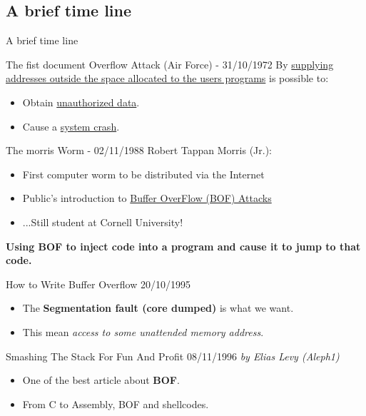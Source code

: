 \subsection{A brief time line}
\begin{frame}{A brief time line}

\begin{block}{The fist document Overflow Attack (Air Force) - 31/10/1972}
By \underline{supplying addresses outside the space allocated to the users programs} is possible to: 
\begin{itemize}
\item Obtain \underline{unauthorized data}.
\item Cause a \underline{system crash}.
\end{itemize}
\end{block}

\framebreak

\begin{block}{The morris Worm - 02/11/1988}
	Robert Tappan Morris (Jr.):
	\begin{itemize}
 		\item First computer worm to be distributed via the Internet
 		\item Public’s introduction to \underline{Buffer OverFlow (BOF) Attacks}
 		\item ...Still student at Cornell University!
 	\end{itemize}

\begin{center}
\bf Using BOF to inject code into a program and cause it to jump to that code.
\end{center}

\end{block}

\framebreak

\begin{block}{How to Write Buffer Overflow 20/10/1995}
	\begin{itemize}
		\item The {\bf Segmentation fault (core dumped)} is what we want.
		\item This mean \emph{access to some unattended memory address}.
	\end{itemize}
\end{block}

\begin{block}{Smashing The Stack For Fun And Profit 08/11/1996}
	\emph{by Elias Levy (Aleph1)}
	\begin{itemize}
		\item One of the best article about {\bf BOF}.
		\item From C to Assembly, BOF and shellcodes.
	\end{itemize}
\end{block}

\end{frame}

